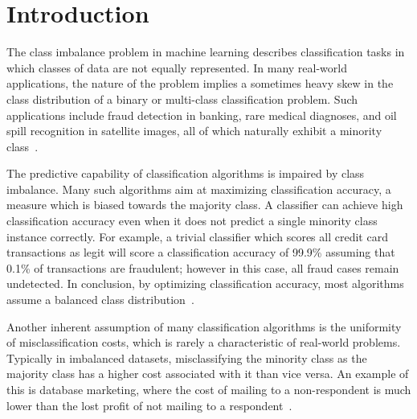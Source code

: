\documentclass[sort&compress]{elsarticle}
\begin{document}

\section{Introduction}
The class imbalance problem in machine learning describes classification tasks
in which classes of data are not equally represented. In many real-world
applications, the nature of the problem implies a sometimes heavy skew in the
class distribution of a binary or multi-class classification problem. Such
applications include fraud detection in banking, rare medical diagnoses, and oil
spill recognition in satellite images, all of which naturally exhibit a minority
class~\citep{Chawla.2002,Kotsiantis.2006,Kotsiantis.2007,Galar.2012}.

The predictive capability of classification algorithms is impaired by class
imbalance. Many such algorithms aim at maximizing classification accuracy, a
measure which is biased towards the majority class. A classifier can achieve
high classification accuracy even when it does not predict a single minority
class instance correctly. For example, a trivial classifier which scores all
credit card transactions as legit will score a classification accuracy of 99.9\%
assuming that 0.1\% of transactions are fraudulent; however in this case, all
fraud cases remain undetected. In conclusion, by optimizing classification
accuracy, most algorithms assume a balanced class
distribution~\citep{Provost.2000,Kotsiantis.2007}.

Another inherent assumption of many classification algorithms is the uniformity
of misclassification costs, which is rarely a characteristic of real-world
problems. Typically in imbalanced datasets, misclassifying the minority class as
the majority class has a higher cost associated with it than vice versa. An
example of this is database marketing, where the cost of mailing to a
non-respondent is much lower than the lost profit of not mailing to a
respondent~\citep{Domingos.1999}.
\end{document}
